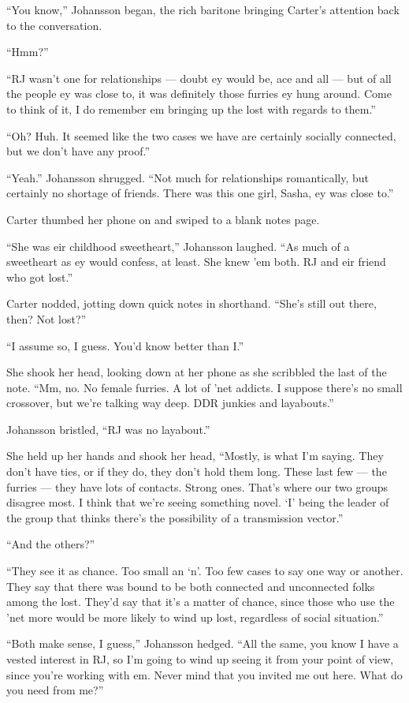 ``You know,'' Johansson began, the rich baritone bringing Carter's attention back to the conversation.

``Hmm?''

``RJ wasn't one for relationships --- doubt ey would be, ace and all --- but of all the people ey was close to, it was definitely those furries ey hung around. Come to think of it, I do remember em bringing up the lost with regards to them.''

``Oh? Huh. It seemed like the two cases we have are certainly socially connected, but we don't have any proof.''

``Yeah.'' Johansson shrugged. ``Not much for relationships romantically, but certainly no shortage of friends. There was this one girl, Sasha, ey was close to.''

Carter thumbed her phone on and swiped to a blank notes page.

``She was eir childhood sweetheart,'' Johansson laughed. ``As much of a sweetheart as ey would confess, at least. She knew 'em both. RJ and eir friend who got lost.''

Carter nodded, jotting down quick notes in shorthand. ``She's still out there, then? Not lost?''

``I assume so, I guess. You'd know better than I.''

She shook her head, looking down at her phone as she scribbled the last of the note. ``Mm, no. No female furries. A lot of 'net addicts. I suppose there's no small crossover, but we're talking way deep. DDR junkies and layabouts.''

Johansson bristled, ``RJ was no layabout.''

She held up her hands and shook her head, ``Mostly, is what I'm saying. They don't have ties, or if they do, they don't hold them long. These last few --- the furries --- they have lots of contacts. Strong ones. That's where our two groups disagree most. I think that we're seeing something novel. `I' being the leader of the group that thinks there's the possibility of a transmission vector.''

``And the others?''

``They see it as chance. Too small an `n'. Too few cases to say one way or another. They say that there was bound to be both connected and unconnected folks among the lost. They'd say that it's a matter of chance, since those who use the 'net more would be more likely to wind up lost, regardless of social situation.''

``Both make sense, I guess,'' Johansson hedged. ``All the same, you know I have a vested interest in RJ, so I'm going to wind up seeing it from your point of view, since you're working with em. Never mind that you invited me out here. What do you need from me?''

